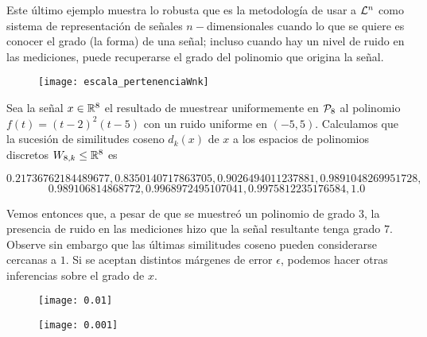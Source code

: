 Este último ejemplo muestra lo robusta que es la metodología
de usar a $\mathcal{L}^{n}$ como sistema de representación
de señales $n-$dimensionales cuando lo que se quiere es 
conocer el grado (la forma) de una señal; incluso cuando hay 
un nivel de ruido en las mediciones, puede 
recuperarse el grado del polinomio que origina la señal.

\begin{figure}[H]
	\centering
	\texttt{[image: escala\_pertenenciaWnk]} 
\end{figure}	

\begin{ejemplo}
\label{ej: estimando grado senal ruidosa}
Sea la señal $x \in \mathbb{R}^{8}$ el resultado de muestrear
uniformemente en $\mathcal{P}_{8}$ al polinomio
$f(t) = (t-2)^2(t-5)$ con un ruido uniforme
en $(-5, 5)$. Calculamos que
la sucesión de similitudes coseno $d_{k}(x)$ de $x$
a los espacios de polinomios discretos $W_{8, k} \leq \mathbb{R}^{8}$
es

\[ 0.21736762184489677, 0.8350140717863705, 0.9026494011237881, 0.9891048269951728, 
\]
\[
0.989106814868772, 0.9968972495107041, 0.9975812235176584, 1.0
\]

Vemos entonces que, a pesar de que se muestreó un polinomio
de grado $3$, la presencia de ruido en las mediciones
hizo que la señal resultante tenga grado $7$.
Observe sin embargo que las últimas similitudes coseno 
pueden considerarse cercanas a $1$. Si se aceptan 
distintos márgenes de error $\epsilon$, podemos hacer otras
inferencias sobre el grado de $x$.


\begin{figure}[H]
	\centering
	\texttt{[image: 0.01]} 
\end{figure}	

\begin{figure}[H]
	\centering
	\texttt{[image: 0.001]} 
\end{figure}	


\end{ejemplo}

